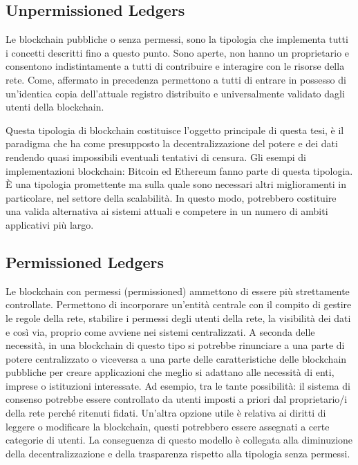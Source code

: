 \subsection{Unpermissioned Ledgers}

Le blockchain pubbliche o senza permessi, sono la tipologia che implementa tutti i concetti descritti fino a questo punto. Sono aperte, non hanno un proprietario e consentono indistintamente a tutti di contribuire e interagire con le risorse della rete. Come, affermato in precedenza permettono a tutti di entrare in possesso di un’identica copia dell’attuale registro distribuito e universalmente validato dagli utenti della blockchain.

Questa tipologia di blockchain costituisce l’oggetto principale di questa tesi, è il paradigma che ha come presupposto la decentralizzazione del potere e dei dati rendendo quasi impossibili eventuali tentativi di censura. Gli esempi di implementazioni blockchain: Bitcoin ed Ethereum fanno parte di questa tipologia. È una tipologia promettente ma sulla quale sono necessari altri miglioramenti in particolare, nel settore della scalabilità. In questo modo, potrebbero costituire una valida alternativa ai sistemi attuali e competere in un numero di ambiti applicativi più largo.

\subsection{Permissioned Ledgers}

Le blockchain con permessi (permissioned) ammettono di essere più strettamente controllate. Permettono di incorporare un’entità centrale con il compito di gestire le regole della rete, stabilire i permessi degli utenti della rete, la visibilità dei dati e così via, proprio come avviene nei sistemi centralizzati. A seconda delle necessità, in una blockchain di questo tipo si potrebbe rinunciare a una parte di potere centralizzato o viceversa a una parte delle caratteristiche delle blockchain pubbliche per creare applicazioni che meglio si adattano alle necessità di enti, imprese o istituzioni interessate. Ad esempio, tra le tante possibilità: il sistema di consenso potrebbe essere controllato da utenti imposti a priori dal proprietario/i della rete perché ritenuti fidati. Un'altra opzione utile è relativa ai diritti di leggere o modificare la blockchain, questi potrebbero essere assegnati a certe categorie di utenti. La conseguenza di questo modello è collegata alla diminuzione della decentralizzazione e della trasparenza rispetto alla tipologia senza permessi.

